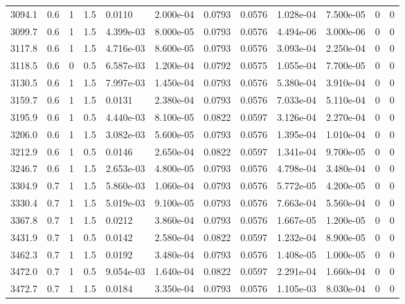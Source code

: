 \documentclass[preview]{standalone}
\begin{document}
{{{\begin{tabular}{L{1.2cm}C{1.2cm} C{0.3cm}C{0.5cm} C{1.4cm}C{1.4cm} C{1.4cm}C{1.4cm} C{1.6cm}C{1.6cm} C{1.6cm}C{1.6cm}}
  3094.1  &   0.6  & 1     & 1.5 &  0.0110  & 2.000e-04  &  0.0793&   0.0576& 1.028e-04 & 7.500e-05   &  0 & 0  \\ 
  3099.7  &   0.6  & 1     & 1.5 &  4.399e-03  & 8.000e-05  &  0.0793&   0.0576& 4.494e-06 & 3.000e-06   &  0 & 0  \\ 
  3117.8  &   0.6  & 1     & 1.5 &  4.716e-03  & 8.600e-05  &  0.0793&   0.0576& 3.093e-04 & 2.250e-04   &  0 & 0  \\ 
  3118.5  &   0.6  & 0     & 0.5 &  6.587e-03  & 1.200e-04  &  0.0792&   0.0575& 1.055e-04 & 7.700e-05   &  0 & 0  \\ 
  3130.5  &   0.6  & 1     & 1.5 &  7.997e-03  & 1.450e-04  &  0.0793&   0.0576& 5.380e-04 & 3.910e-04   &  0 & 0  \\ 
  3159.7  &   0.6  & 1     & 1.5 &  0.0131  & 2.380e-04  &  0.0793&   0.0576& 7.033e-04 & 5.110e-04   &  0 & 0  \\ 
  3195.9  &   0.6  & 1     & 0.5 &  4.440e-03  & 8.100e-05  &  0.0822&   0.0597& 3.126e-04 & 2.270e-04   &  0 & 0  \\ 
  3206.0  &   0.6  & 1     & 1.5 &  3.082e-03  & 5.600e-05  &  0.0793&   0.0576& 1.395e-04 & 1.010e-04   &  0 & 0  \\ 
  3212.9  &   0.6  & 1     & 0.5 &  0.0146  & 2.650e-04  &  0.0822&   0.0597& 1.341e-04 & 9.700e-05   &  0 & 0  \\ 
  3246.7  &   0.6  & 1     & 1.5 &  2.653e-03  & 4.800e-05  &  0.0793&   0.0576& 4.798e-04 & 3.480e-04   &  0 & 0  \\ 
  3304.9  &   0.7  & 1     & 1.5 &  5.860e-03  & 1.060e-04  &  0.0793&   0.0576& 5.772e-05 & 4.200e-05   &  0 & 0  \\ 
  3330.4  &   0.7  & 1     & 1.5 &  5.019e-03  & 9.100e-05  &  0.0793&   0.0576& 7.663e-04 & 5.560e-04   &  0 & 0  \\ 
  3367.8  &   0.7  & 1     & 1.5 &  0.0212  & 3.860e-04  &  0.0793&   0.0576& 1.667e-05 & 1.200e-05   &  0 & 0  \\ 
  3431.9  &   0.7  & 1     & 0.5 &  0.0142  & 2.580e-04  &  0.0822&   0.0597& 1.232e-04 & 8.900e-05   &  0 & 0  \\ 
  3462.3  &   0.7  & 1     & 1.5 &  0.0192  & 3.480e-04  &  0.0793&   0.0576& 1.408e-05 & 1.000e-05   &  0 & 0  \\ 
  3472.0  &   0.7  & 1     & 0.5 &  9.054e-03  & 1.640e-04  &  0.0822&   0.0597& 2.291e-04 & 1.660e-04   &  0 & 0  \\ 
  3472.7  &   0.7  & 1     & 1.5 &  0.0184  & 3.350e-04  &  0.0793&   0.0576& 1.105e-03 & 8.030e-04   &  0 & 0  \\ 

\end{tabular}}}}
\end{document}

